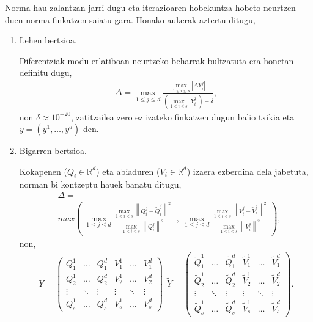 Norma hau zalantzan jarri dugu eta iterazioaren hobekuntza hobeto neurtzen duen norma finkatzen saiatu gara. Honako aukerak aztertu ditugu,
\begin{enumerate}
\item Lehen bertsioa.

Diferentziak modu erlatiboan neurtzeko beharrak bultzatuta era honetan definitu dugu,
\begin{align*}
\Delta=\max_{1 \leqslant j \leqslant d} \frac{\max_{1 \leqslant i \leqslant s} |\Delta Y_i^j|}
                                                {(\max_{1 \leqslant i \leqslant s}|Y_i^j|)+\delta},
\end{align*}
non $\delta \approx 10^{-20}$, zatitzailea zero ez izateko finkatzen dugun balio txikia  eta $y=(y^1,\dots,y^d)$ den.

\item Bigarren bertsioa.

Kokapenen ($Q_i \in \mathbb{R}^d$) eta abiaduren ($V_i \in \mathbb{R}^d$) izaera ezberdina dela jabetuta, norman bi kontzeptu hauek banatu ditugu, 
\begin{align*}
 & \Delta =\\
 & max\left({\  {\max_{1\le j\le d} \frac{{\max_{1\le i\le s} {\left\|Q^{j}_i-{\tilde{Q}}^{j}_i\right\|}^2\ }}{{\max_{1\le i\le s} {\left\|Q^{j}_i\right\|}^2\ }}\ }\ },\ {\max_{1\le j\le d} \frac{{\max_{1\le i\le s} {\left\|V^{j}_i-{\tilde{V}}^{j}_i\right\|}^2\ }}{{\max_{1\le i\le s} {\left\|V^{j}_i\right\|}^2\ }}\ }\right),
\end{align*}
non,
\begin{align*}
Y=\left( \begin{array}{cccccc}
Q^{1}_1 & \dots  & Q^{d}_1 & V^{1}_1 & \dots  & V^{d}_1 \\ 
Q^{1}_2 & \dots  & Q^{d}_2 & V^{1}_2 & \dots  & V^{d}_2 \\ 
\vdots  & \ddots  & \vdots  & \vdots  & \ddots  & \vdots  \\ 
Q^{1}_s & \dots  & Q^{d}_s & V^{1}_s & \dots  & V^{d}_s \end{array}
\right)\ \  
\tilde Y=\left( \begin{array}{cccccc}
\tilde Q^{1}_1 & \dots  & \tilde Q^{d}_1 & \tilde V^{1}_1 & \dots  & \tilde V^{d}_1 \\ 
\tilde Q^{1}_2 & \dots  & \tilde Q^{d}_2 & \tilde V^{1}_2 & \dots  & \tilde V^{d}_2 \\ 
\vdots  & \ddots  & \vdots  & \vdots  & \ddots  & \vdots  \\ 
\tilde Q^{1}_s & \dots  & \tilde Q^{d}_s & \tilde V^{1}_s & \dots  & \tilde V^{d}_s \end{array}
\right). 
\end{align*}


\end{enumerate}
